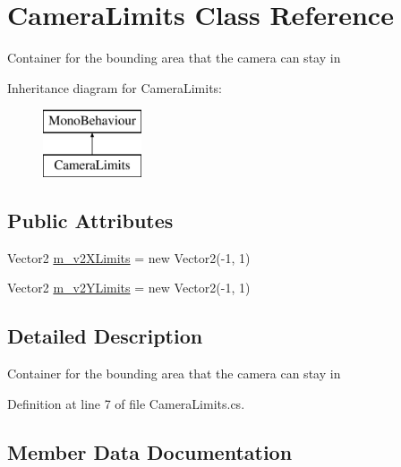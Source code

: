 \hypertarget{class_camera_limits}{}\section{Camera\+Limits Class Reference}
\label{class_camera_limits}


Container for the bounding area that the camera can stay in  


Inheritance diagram for Camera\+Limits\+:\begin{figure}[H]
\begin{center}
\leavevmode
\includegraphics[height=2.000000cm]{class_camera_limits}
\end{center}
\end{figure}
\subsection*{Public Attributes}
\begin{DoxyCompactItemize}
\item 
Vector2 \mbox{\hyperlink{class_camera_limits_abc540092c29118d85ce831c17d1a5e42}{m\+\_\+v2\+X\+Limits}} = new Vector2(-\/1, 1)
\item 
Vector2 \mbox{\hyperlink{class_camera_limits_a417ee3a501b841675c99d69b36029e3d}{m\+\_\+v2\+Y\+Limits}} = new Vector2(-\/1, 1)
\end{DoxyCompactItemize}


\subsection{Detailed Description}
Container for the bounding area that the camera can stay in 



Definition at line 7 of file Camera\+Limits.\+cs.



\subsection{Member Data Documentation}
\mbox{\label{class_camera_limits_abc540092c29118d85ce831c17d1a5e42}} 
